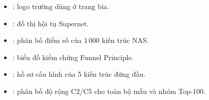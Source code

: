 \begin{itemize}
  \item {}: logo trường dùng ở trang bìa.
  \item {}: đồ thị hội tụ Supernet.
  \item {}: phân bố điểm số của 1\,000 kiến trúc NAS.
  \item {}: biểu đồ kiểm chứng Funnel Principle.
  \item {}: hồ sơ cấu hình của 5 kiến trúc đứng đầu.
  \item {}: phân bố độ rộng C2/C5 cho toàn bộ mẫu và nhóm Top-100.
\end{itemize}
